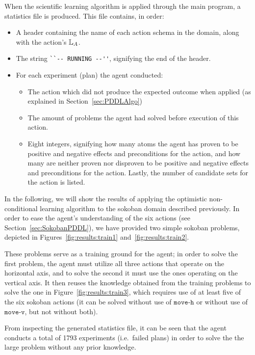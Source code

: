 \documentclass[../Master.tex]{subfiles}
\begin{document}
When the scientific learning algorithm is applied through the main program, a statistics file is produced. This file contains, in order:
\begin{itemize}
    \item A header containing the name of each action schema in the domain, along with the action's $\mathbb{L}_A$.
    \item The string \verb|``-- RUNNING --''|, signifying the end of the header.
    \item For each experiment (plan) the agent conducted:
        \begin{itemize}
            \item The action which did not produce the expected outcome when applied (as explained in Section~\ref{sec:PDDLAlgo})
            \item The amount of problems the agent had solved before execution of this action.
            \item Eight integers, signifying how many  atoms the agent has proven to be positive and negative effects and preconditions for the action, and how many are neither proven nor disproven to be positive and negative effects and preconditions for the action. Lastly, the number of candidate sets for the action is listed.
        \end{itemize}
\end{itemize}

In the following, we will show the results of applying the optimistic non-conditional learning algorithm to the sokoban domain described previously. In order to ease the agent's understanding of the  six actions (see Section~\ref{sec:SokobanPDDL}), we have provided two simple sokoban problems, depicted in Figures~\ref{fig:results:train1} and~\ref{fig:results:train2}. 

These problems serve as a training ground for the agent; in order to solve the first problem, the agent must utilize all three actions that operate on the horizontal axis, and to solve the second it must use the ones operating on the vertical axis. It then reuses the knowledge obtained from the training problems to solve the one in Figure~\ref{fig:results:train3}, which requires use of at least five of the six sokoban actions (it can be solved without use of $\texttt{move-h}$ or without use of $\texttt{move-v}$, but not without both).

From inspecting the generated statistics file, it can be seen that the agent conducts a total of 1793 experiments (i.e.\ failed plans) in order to solve the the large problem without any prior knowledge.
\end{document}

